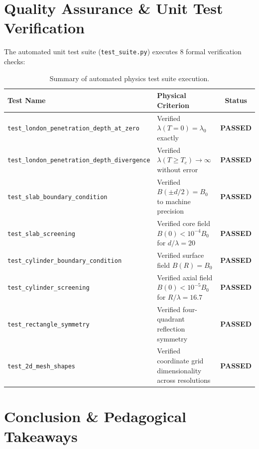 \documentclass[11pt,a4paper]{article}
\begin{document}
\section{Quality Assurance \& Unit Test Verification}
The automated unit test suite (\texttt{test\_suite.py}) executes 8 formal verification checks:
\begin{table}[H]
    \centering
    \small
    \renewcommand{\arraystretch}{1.2}
    \begin{tabular}{p{} p{} c}
        \toprule
        \textbf{Test Name} & \textbf{Physical Criterion} & \textbf{Status} \\
        \midrule
        \texttt{test\_london\_penetration\_depth\_at\_zero} & Verified $\lambda(T=0) = \lambda_0$ exactly & \textbf{PASSED} \\
        \texttt{test\_london\_penetration\_depth\_divergence} & Verified $\lambda(T \ge T_c) \to \infty$ without error & \textbf{PASSED} \\
        \texttt{test\_slab\_boundary\_condition} & Verified $B(\pm d/2) = B_0$ to machine precision & \textbf{PASSED} \\
        \texttt{test\_slab\_screening} & Verified core field $B(0) < 10^{-4} B_0$ for $d/\lambda = 20$ & \textbf{PASSED} \\
        \texttt{test\_cylinder\_boundary\_condition} & Verified surface field $B(R) = B_0$ & \textbf{PASSED} \\
        \texttt{test\_cylinder\_screening} & Verified axial field $B(0) < 10^{-5} B_0$ for $R/\lambda = 16.7$ & \textbf{PASSED} \\
        \texttt{test\_rectangle\_symmetry} & Verified four-quadrant reflection symmetry & \textbf{PASSED} \\
        \texttt{test\_2d\_mesh\_shapes} & Verified coordinate grid dimensionality across resolutions & \textbf{PASSED} \\
        \bottomrule
    \end{tabular}
    \caption{Summary of automated physics test suite execution.}
    \label{tab:tests}
\end{table}

\section{Conclusion \& Pedagogical Takeaways}
\end{document}
